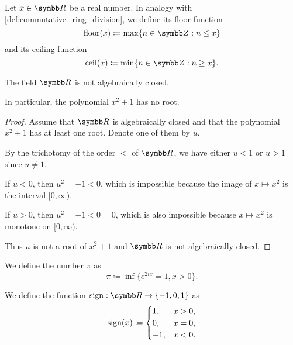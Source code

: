 \begin{definition}\label{def:floor_ceiling_functions}
  Let \( x \in \R \) be a real number. In analogy with \cref{def:commutative_ring_division}, we define its floor function
  \begin{equation*}
    \Floor(x) \coloneqq \max \{ n \in \Z : n \leq x \}
  \end{equation*}
  and its ceiling function
  \begin{equation*}
    \Ceil(x) \coloneqq \min \{ n \in \Z : n \geq x \}.
  \end{equation*}
\end{definition}

\begin{proposition}\label{thm:reals_not_algebraically_closed}
  The field \( \R \) is not algebraically closed.

  In particular, the polynomial \( x^2 + 1 \) has no root.
\end{proposition}
\begin{proof}
  Assume that \( \R \) is algebraically closed and that the polynomial \( x^2 + 1 \) has at least one root. Denote one of them by \( u \).

  By the trichotomy of the order \( < \) of \( \R \), we have either \( u < 1 \) or \( u > 1 \) since \( u \neq 1 \).

  If \( u < 0 \), then \( u^2 = -1 < 0 \), which is impossible because the image of \( x \mapsto x^2 \) is the interval \( [0, \infty) \).

  If \( u > 0 \), then \( u^2 = -1 < 0 = 0 \), which is also impossible because \( x \mapsto x^2 \) is monotone on \( [0, \infty) \).

  Thus \( u \) is not a root of \( x^2 + 1 \) and \( \R \) is not algebraically closed.
\end{proof}

\begin{definition}\label{def:pi}\cite[515]{Knapp2016BAlg}
  We define the number \( \pi \) as
  \begin{equation*}
    \pi \coloneqq \inf\{ e^{2ix} = 1, x > 0 \}.
  \end{equation*}
\end{definition}

\begin{definition}\label{def:signum}
  We define the  function \( \Sign: \R \to \{ -1, 0, 1 \} \) as
  \begin{equation*}
    \operatorname{sign}(x) \coloneqq \begin{cases}
      1,  &x > 0, \\
      0,  &x = 0, \\
      -1, &x < 0.
    \end{cases}
  \end{equation*}
\end{definition}
